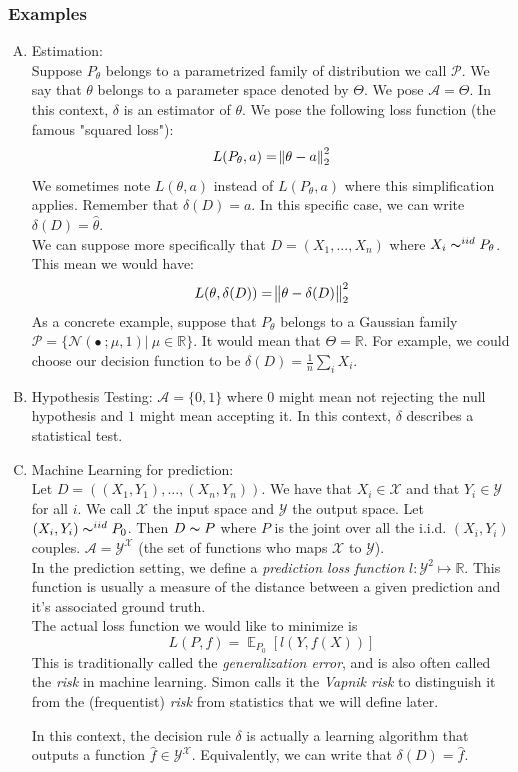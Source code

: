 \documentclass[12pt]{report}
\renewcommand{\emph}[1]{\color{violet}#1\color{black}{}}
\DeclareMathOperator{\E}{\mathbb{E}}
\begin{document}
\subsubsection{Examples}
\begin{enumerate}[A)]
\item \emph{Estimation}:\\
Suppose $P_{\theta}$ belongs to a parametrized family of distribution we call $\mathcal{P}$. We say that $\theta$ belongs to a parameter space denoted by $\Theta$. We pose $\mathcal{A}=\Theta$. In this context, $\delta$ is an estimator of $\theta$. We pose the following loss function (the famous "squared loss"):
$$L(P_{\theta}, a) = \norm{\theta - a}^2_2$$
We sometimes note $L(\theta, a)$ instead of $L(P_{\theta}, a)$ where this simplification applies. Remember that $\delta(D) = a$. In this specific case, we can write $\delta(D) = \hat{\theta}$.\\
We can suppose more specifically that $D = (X_1,...,X_n)$ where $X_i \thicksim^{iid} P_\theta$. This mean we would have:
$$L(\theta, \delta(D))=\norm{\theta - \delta(D)}^2_2$$
As a concrete example, suppose that $P_\theta$ belongs to a Gaussian family $\mathcal{P}=\{\mathcal{N}(\bullet\ ;\mu,1)|\ \mu \in \mathbb{R}\}$.
It would mean that $\Theta=\mathbb{R}$. For example, we could choose our decision function to be $\delta(D)=\frac{1}{n}\sum_i X_i$.
\item \emph{Hypothesis Testing}:
$\mathcal{A}=\{0,1\}$ where $0$ might mean not rejecting the null hypothesis and $1$ might mean accepting it. In this context, $\delta$ describes a statistical test.
\item \emph{Machine Learning for prediction}:\\
Let $D=((X_1,Y_1),...,(X_n,Y_n))$. We have that $X_i \in \mathcal{X}$ and that $Y_i \in \mathcal{Y}$ for all $i$. We call $\mathcal{X}$ the input space and $\mathcal{Y}$ the output space. Let $(X_i,Y_i) \thicksim^{iid} P_0$. Then $D \thicksim P$ where $P$ is the joint over all the i.i.d. $(X_i,Y_i)$ couples. $\mathcal{A}=\mathcal{Y}^\mathcal{X}$ (the set of functions who maps $\mathcal{X}$ to $\mathcal{Y}$). \\
In the prediction setting, we define a \textit{prediction loss function} $l:\mathcal{Y}^2 \mapsto \mathbb{R}$. This function is usually a measure of the distance between a given prediction and it's associated ground truth.\\
The actual loss function we would like to minimize is
$$L(P,f)=\E_{P_0}[l(Y,f(X))]$$
This is traditionally called the \textit{generalization error}, and is also often called the \textit{risk} in machine learning. Simon calls it the \textit{Vapnik risk} to distinguish it from the (frequentist) \textit{risk} from statistics that we will define later.

In this context, the decision rule $\delta$ is actually a learning algorithm that outputs a function $\hat{f} \in \mathcal{Y}^\mathcal{X}$. Equivalently, we can write that $\delta(D)=\hat{f}$.
\end{enumerate}
\end{document}
